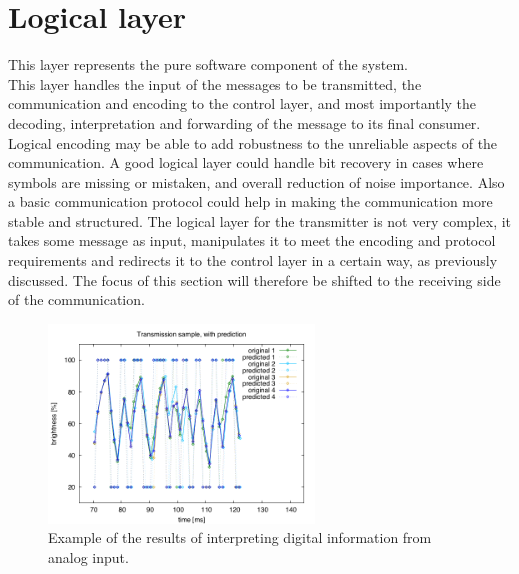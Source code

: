 
\section{Logical layer}
\label{logical}


This layer represents the pure software component of the system.\\
This layer handles the input of the messages to be transmitted, the communication and encoding to the control layer, and most importantly the decoding, interpretation and forwarding of the message to its final consumer.
Logical encoding may be able to add robustness to the unreliable aspects of the communication.
A good logical layer could handle bit recovery in cases where symbols are missing or mistaken, and overall reduction of noise importance. 
Also a basic communication protocol could help in making the communication more stable and structured.
The logical layer for the transmitter is not very complex, it takes some message as input, manipulates it to meet the encoding and protocol requirements and redirects it to the control layer in a certain way, as previously discussed. 
The focus of this section will therefore be shifted to the receiving side of the communication.
 
\begin{figure}[htbp] %
   \centering
   \includegraphics[height=200px]{img/sample} 
   \caption{Example of the results of interpreting digital information from analog input.}
   \label{fig:sample}
\end{figure}

